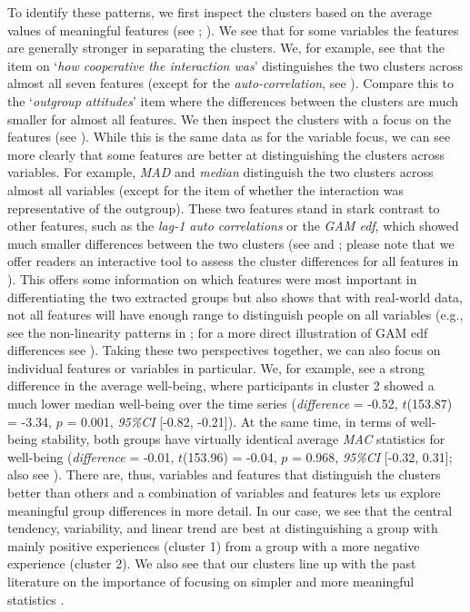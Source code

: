 To identify these patterns, we first inspect the clusters based on the
average values of meaningful features (see
; \citealp{Kennedy2021}). We see that for
some variables the features are generally stronger in separating the
clusters. We, for example, see that the item on
`\textit{how cooperative the interaction was}' distinguishes the two
clusters across almost all seven features (except for the
\textit{auto-correlation}, see ). Compare
this to the `\textit{outgroup attitudes}' item where the differences
between the clusters are much smaller for almost all features. We then
inspect the clusters with a focus on the features (see
). While this is the same data as for the
variable focus, we can see more clearly that some features are better at
distinguishing the clusters across variables. For example, \textit{MAD}
and \textit{median} distinguish the two clusters across almost all
variables (except for the item of whether the interaction was
representative of the outgroup). These two features stand in stark
contrast to other features, such as the \textit{lag-1 auto correlations}
or the \textit{GAM edf}, which showed much smaller differences between
the two clusters (see  and
; please note that we offer
readers an interactive tool to assess the cluster differences for all
features in \situtorial). This offers some information on which features
were most important in differentiating the two extracted groups but also
shows that with real-world data, not all features will have enough range
to distinguish people on all variables (e.g., see the non-linearity
patterns in ; for a more
direct illustration of GAM edf differences see \citealp{bringmann2017}).
Taking these two perspectives together, we can also focus on individual
features or variables in particular. We, for example, see a strong
difference in the average well-being, where participants in cluster 2
showed a much lower median well-being over the time series
(\textit{difference} = -0.52, \(t\)(153.87) = -3.34, \(p\) = 0.001,
\textit{95\%CI} {[}-0.82, -0.21{]}). At the same time, in terms of
well-being stability, both groups have virtually identical average
\textit{MAC} statistics for well-being (\textit{difference} = -0.01,
\(t\)(153.96) = -0.04, \(p\) = 0.968, \textit{95\%CI} {[}-0.32, 0.31{]};
also see ). There are, thus, variables and
features that distinguish the clusters better than others and a
combination of variables and features lets us explore meaningful group
differences in more detail. In our case, we see that the central
tendency, variability, and linear trend are best at distinguishing a
group with mainly positive experiences (cluster 1) from a group with a
more negative experience (cluster 2). We also see that our clusters line
up with the past literature on the importance of focusing on simpler and
more meaningful statistics
\citep{bringmann2018c, eronen2021a, dejonckheere2019}.

